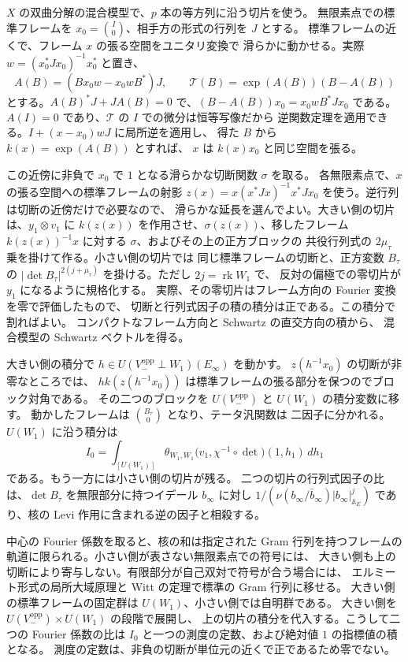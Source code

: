 \(X\) の双曲分解の混合模型で、\(p\) 本の等方列に沿う切片を使う。
無限素点での標準フレームを \(x_0=\binom{I}{0}\)、相手方の形式の行列を \(J\) とする。
標準フレームの近くで、フレーム \(x\) の張る空間をユニタリ変換で
滑らかに動かせる。実際 \(w=(x_0^*Jx_0)^{-1}x_0^*\) と置き、
\[
 A(B)=(Bx_0w-x_0w B^*)J,\qquad
 \mathcal T(B)=\exp(A(B))(B-A(B))
\]
とする。\(A(B)^*J+JA(B)=0\) で、\((B-A(B))x_0=x_0wB^*Jx_0\) である。
\(A(I)=0\) であり、\(\mathcal T\) の \(I\) での微分は恒等写像だから
逆関数定理を適用できる。\(I+(x-x_0)wJ\) に局所逆を適用し、
得た \(B\) から \(k(x)=\exp(A(B))\) とすれば、
\(x\) は \(k(x)x_0\) と同じ空間を張る。

この近傍に非負で \(x_0\) で \(1\) となる滑らかな切断関数 \(\sigma\) を取る。
各無限素点で、\(x\) の張る空間への標準フレームの射影
\(z(x)=x(x^*Jx)^{-1}x^*Jx_0\) を使う。逆行列は切断の近傍だけで必要なので、
滑らかな延長を選んでよい。大きい側の切片は、\(y_1\otimes v_1\) に
\(k(z(x))\) を作用させ、\(\sigma(z(x))\)、移したフレーム \(k(z(x))^{-1}x\)
に対する \(\sigma\)、およびその上の正方ブロックの
共役行列式の \(2\mu_\tau\) 乗を掛けて作る。小さい側の切片では
同じ標準フレームの切断と、正方変数 \(B_\tau\) の
\(|\det B_\tau|^{2(j+\mu_\tau)}\) を掛ける。ただし \(2j=\operatorname{rk}W_1\) で、
反対の偏極での零切片が \(y_1\) になるように規格化する。
実際、その零切片はフレーム方向の Fourier 変換を零で評価したもので、
切断と行列式因子の積の積分は正である。この積分で割ればよい。
コンパクトなフレーム方向と Schwartz の直交方向の積から、
混合模型の Schwartz ベクトルを得る。

大きい側の積分で \(h\in U(V_-^{\mathrm{opp}}\perp W_1)(E_\infty)\) を動かす。
\(z(h^{-1}x_0)\) の切断が非零なところでは、
\(h k(z(h^{-1}x_0))\) は標準フレームの張る部分を保つのでブロック対角である。
その二つのブロックを \(U(V_-^{\mathrm{opp}})\) と \(U(W_1)\) の積分変数に移す。
動かしたフレームは \(\binom{B_\tau}{0}\) となり、テータ汎関数は
二因子に分かれる。\(U(W_1)\) に沿う積分は
\[
 I_0=\int_{[U(W_1)]}
    \theta_{W_1,W_1}\bigl(v_1,\chi^{-1}\circ\det\bigr)(1,h_1)\,dh_1
\]
である。もう一方には小さい側の切片が残る。
二つの切片の行列式因子の比は、\(\det B_\tau\) を無限部分に持つイデール
\(b_\infty\) に対し \(1/(\nu(b_\infty/\bar b_\infty)|b_\infty|_{\mathbb A_E}^{j})\)
であり、核の Levi 作用に含まれる逆の因子と相殺する。

中心の Fourier 係数を取ると、核の和は指定された Gram 行列を持つフレームの
軌道に限られる。小さい側が表さない無限素点での符号には、
大きい側も上の切断により寄与しない。有限部分が自己双対で符号が合う場合には、
エルミート形式の局所大域原理と Witt の定理で標準の Gram 行列に移せる。
大きい側の標準フレームの固定群は \(U(W_1)\)、小さい側では自明群である。
大きい側を \(U(V_-^{\mathrm{opp}})\times U(W_1)\) の段階で展開し、
上の切片の積分を代入する。こうして二つの Fourier 係数の比は
\(I_0\) と一つの測度の定数、および絶対値 \(1\) の指標値の積となる。
測度の定数は、非負の切断が単位元の近くで正であるため零でない。

